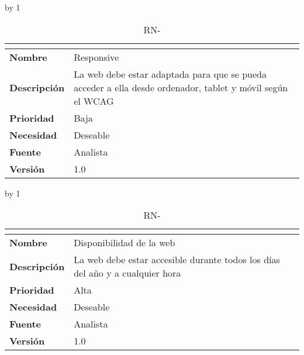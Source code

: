 \advance\rn by 1
\vspace{-.3cm}
\begin{table}[H]
	\caption{RN-\number\rn}
	\begin{tabular}{|l|p{}|}
		\hline
		\multicolumn{2}{|c|}{\cellcolor[HTML]{BFBFBF}{\color[HTML]{000000} \textbf{RN-\number\rn}}} \\ \hline
		\textbf{Nombre}      & Responsive                                                                                                                                 \\ \hline
		\textbf{Descripción} & La web debe estar adaptada para que se pueda acceder a ella desde ordenador, tablet y móvil según el WCAG~\cite{initiative_wai_web_nodate} \\ \hline
		\textbf{Prioridad}   & Baja                                                                                                                                       \\ \hline
		\textbf{Necesidad}   & Deseable                                                                                                                                   \\ \hline
		\textbf{Fuente}      & Analista                                                                                                                                   \\ \hline
		\textbf{Versión}     & 1.0                                                                                                                                        \\ \hline
	\end{tabular}
\end{table}
\advance\rn by 1
\vspace{-.3cm}
\begin{table}[H]
	\caption{RN-\number\rn}
	\begin{tabular}{|l|p{}|}
		\hline
		\multicolumn{2}{|c|}{\cellcolor[HTML]{BFBFBF}{\color[HTML]{000000} \textbf{RN-\number\rn}}} \\ \hline
		\textbf{Nombre}      & Disponibilidad de la web                                                      \\ \hline
		\textbf{Descripción} & La web debe estar accesible durante todos los días del año y a cualquier hora \\ \hline
		\textbf{Prioridad}   & Alta                                                                          \\ \hline
		\textbf{Necesidad}   & Deseable                                                                      \\ \hline
		\textbf{Fuente}      & Analista                                                                      \\ \hline
		\textbf{Versión}     & 1.0                                                                           \\ \hline
	\end{tabular}
\end{table}
